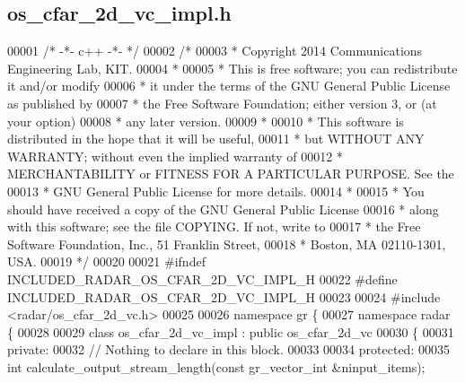 \subsection{os\+\_\+cfar\+\_\+2d\+\_\+vc\+\_\+impl.\+h}
\label{os__cfar__2d__vc__impl_8h_source}

\begin{DoxyCode}
00001 \textcolor{comment}{/* -*- c++ -*- */}
00002 \textcolor{comment}{/* }
00003 \textcolor{comment}{ * Copyright 2014 Communications Engineering Lab, KIT.}
00004 \textcolor{comment}{ * }
00005 \textcolor{comment}{ * This is free software; you can redistribute it and/or modify}
00006 \textcolor{comment}{ * it under the terms of the GNU General Public License as published by}
00007 \textcolor{comment}{ * the Free Software Foundation; either version 3, or (at your option)}
00008 \textcolor{comment}{ * any later version.}
00009 \textcolor{comment}{ * }
00010 \textcolor{comment}{ * This software is distributed in the hope that it will be useful,}
00011 \textcolor{comment}{ * but WITHOUT ANY WARRANTY; without even the implied warranty of}
00012 \textcolor{comment}{ * MERCHANTABILITY or FITNESS FOR A PARTICULAR PURPOSE.  See the}
00013 \textcolor{comment}{ * GNU General Public License for more details.}
00014 \textcolor{comment}{ * }
00015 \textcolor{comment}{ * You should have received a copy of the GNU General Public License}
00016 \textcolor{comment}{ * along with this software; see the file COPYING.  If not, write to}
00017 \textcolor{comment}{ * the Free Software Foundation, Inc., 51 Franklin Street,}
00018 \textcolor{comment}{ * Boston, MA 02110-1301, USA.}
00019 \textcolor{comment}{ */}
00020 
00021 \textcolor{preprocessor}{#ifndef INCLUDED\_RADAR\_OS\_CFAR\_2D\_VC\_IMPL\_H}
00022 \textcolor{preprocessor}{#define INCLUDED\_RADAR\_OS\_CFAR\_2D\_VC\_IMPL\_H}
00023 
00024 \textcolor{preprocessor}{#include <radar/os_cfar_2d_vc.h>}
00025 
00026 \textcolor{keyword}{namespace }gr \{
00027   \textcolor{keyword}{namespace }radar \{
00028 
00029     \textcolor{keyword}{class }os_cfar_2d_vc_impl : \textcolor{keyword}{public} os_cfar_2d_vc
00030     \{
00031      \textcolor{keyword}{private}:
00032       \textcolor{comment}{// Nothing to declare in this block.}
00033 
00034      \textcolor{keyword}{protected}:
00035       \textcolor{keywordtype}{int} calculate_output_stream_length(\textcolor{keyword}{const} gr\_vector\_int &ninput\_items);

\end{DoxyCode}
